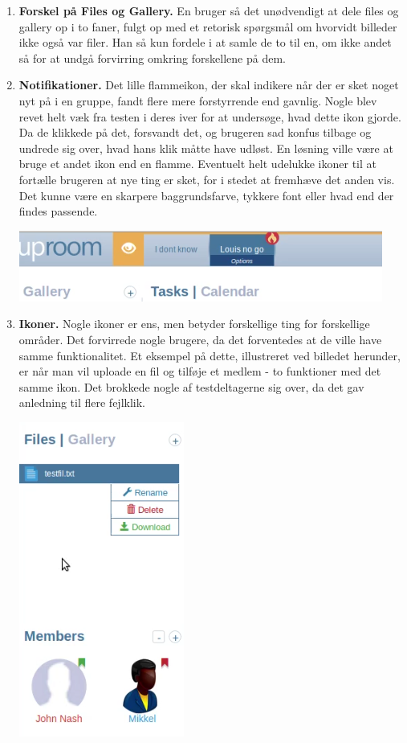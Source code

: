 \documentclass[12pt]{article}
\begin{document}
\begin{enumerate}
  \item \textbf{Forskel på Files og Gallery.} En bruger så det unødvendigt at dele files og gallery op i to faner, fulgt op med et retorisk spørgsmål om hvorvidt billeder ikke også var filer. Han så kun fordele i at samle de to til en, om ikke andet så for at undgå forvirring omkring forskellene på dem.

  \item \textbf{Notifikationer.} Det lille flammeikon, der skal indikere når der er sket noget nyt på i en gruppe, fandt flere mere forstyrrende end gavnlig. Nogle blev revet helt væk fra testen i deres iver for at undersøge, hvad dette ikon gjorde. Da de klikkede på det, forsvandt det, og brugeren sad konfus tilbage og undrede sig over, hvad hans klik måtte have udløst. En løsning ville være at bruge et andet ikon end en flamme. Eventuelt helt udelukke ikoner til at fortælle brugeren at nye ting er sket, for i stedet at fremhæve det anden vis. Det kunne være en skarpere baggrundsfarve, tykkere font eller hvad end der findes passende.
  
      \begin{center}\includegraphics[scale=0.5]{Billeder/Delete-Member2}\end{center} 
  \item \textbf{Ikoner.} Nogle ikoner er ens, men betyder forskellige ting for forskellige områder. Det forvirrede nogle brugere, da det forventedes at de ville have samme funktionalitet. Et eksempel på dette, illustreret ved billedet herunder, er når man vil uploade en fil og tilføje et medlem - to funktioner med det samme ikon. Det brokkede nogle af testdeltagerne sig over, da det gav anledning til flere fejlklik.
  
  \begin{center}\includegraphics[scale=0.5]{Billeder/Delet-File}\end{center}
 

\end{enumerate}
\end{document}
